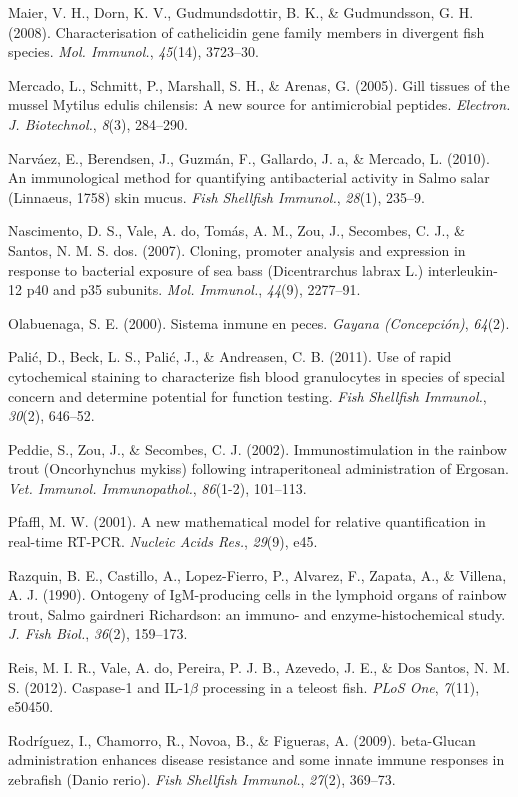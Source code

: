 \documentclass[12pt,a4paper,oneside]{scrbook}
\begin{document}
Maier, V. H., Dorn, K. V., Gudmundsdottir, B. K., \& Gudmundsson, G. H.
(2008). Characterisation of cathelicidin gene family members in
divergent fish species. \emph{Mol. Immunol.}, \emph{45}(14), 3723--30.

Mercado, L., Schmitt, P., Marshall, S. H., \& Arenas, G. (2005). Gill
tissues of the mussel Mytilus edulis chilensis: A new source for
antimicrobial peptides. \emph{Electron. J. Biotechnol.}, \emph{8}(3),
284--290.

Narváez, E., Berendsen, J., Guzmán, F., Gallardo, J. a, \& Mercado, L.
(2010). An immunological method for quantifying antibacterial activity
in Salmo salar (Linnaeus, 1758) skin mucus. \emph{Fish Shellfish
Immunol.}, \emph{28}(1), 235--9.

Nascimento, D. S., Vale, A. do, Tomás, A. M., Zou, J., Secombes, C. J.,
\& Santos, N. M. S. dos. (2007). Cloning, promoter analysis and
expression in response to bacterial exposure of sea bass (Dicentrarchus
labrax L.) interleukin-12 p40 and p35 subunits. \emph{Mol. Immunol.},
\emph{44}(9), 2277--91.

Olabuenaga, S. E. (2000). Sistema inmune en peces. \emph{Gayana
(Concepción)}, \emph{64}(2).

Palić, D., Beck, L. S., Palić, J., \& Andreasen, C. B. (2011). Use of
rapid cytochemical staining to characterize fish blood granulocytes in
species of special concern and determine potential for function testing.
\emph{Fish Shellfish Immunol.}, \emph{30}(2), 646--52.

Peddie, S., Zou, J., \& Secombes, C. J. (2002). Immunostimulation in the
rainbow trout (Oncorhynchus mykiss) following intraperitoneal
administration of Ergosan. \emph{Vet. Immunol. Immunopathol.},
\emph{86}(1-2), 101--113.

Pfaffl, M. W. (2001). A new mathematical model for relative
quantification in real-time RT-PCR. \emph{Nucleic Acids Res.},
\emph{29}(9), e45.

Razquin, B. E., Castillo, A., Lopez-Fierro, P., Alvarez, F., Zapata, A.,
\& Villena, A. J. (1990). Ontogeny of IgM-producing cells in the
lymphoid organs of rainbow trout, Salmo gairdneri Richardson: an immuno-
and enzyme-histochemical study. \emph{J. Fish Biol.}, \emph{36}(2),
159--173.

Reis, M. I. R., Vale, A. do, Pereira, P. J. B., Azevedo, J. E., \& {Dos
Santos}, N. M. S. (2012). Caspase-1 and IL-1$\beta$ processing in a
teleost fish. \emph{PLoS One}, \emph{7}(11), e50450.

Rodríguez, I., Chamorro, R., Novoa, B., \& Figueras, A. (2009).
beta-Glucan administration enhances disease resistance and some innate
immune responses in zebrafish (Danio rerio). \emph{Fish Shellfish
Immunol.}, \emph{27}(2), 369--73.
\end{document}
